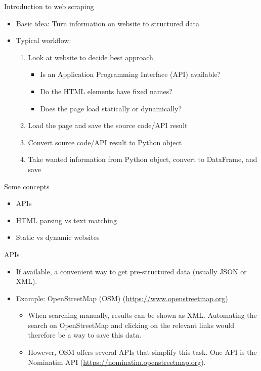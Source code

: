 \begin{frame}{Introduction to web scraping}
\begin{itemize}
	\item Basic idea: Turn information on website to structured data
	\item Typical workflow:
	\begin{enumerate}
		\item Look at website to decide best approach
		\begin{itemize}
			\item Is an Application Programming Interface (API) available?
			\item Do the HTML elements have fixed names?
			\item Does the page load statically or dynamically?
		\end{itemize}
		\item Load the page and save the source code/API result
		\item Convert source code/API result to Python object
		\item Take wanted information from Python object, convert to DataFrame, and save
	\end{enumerate}
\end{itemize}
\end{frame}

\begin{frame}{Some concepts}
\begin{itemize}
	\item APIs
	\item HTML parsing vs text matching
	\item Static vs dynamic websites
\end{itemize}
\end{frame}

\begin{frame}{APIs}
\begin{itemize}
	\item If available, a convenient way to get pre-structured data (usually JSON or XML).
	\item Example: OpenStreetMap (OSM) (\url{https://www.openstreetmap.org})
	\begin{itemize}
		\item When searching manually, results can be shown as XML. Automating the search on OpenStreetMap and clicking on the relevant links would therefore be a way to save this data.
		\item However, OSM offers several APIs that simplify this task. One API is the Nominatim API (\url{https://nominatim.openstreetmap.org}).
	\end{itemize}
\end{itemize}
\end{frame}

